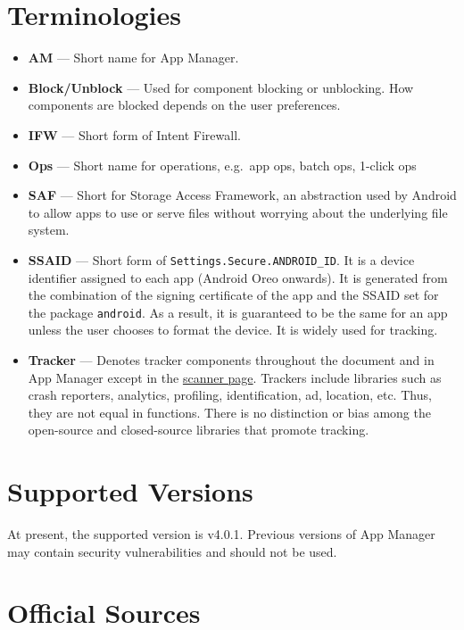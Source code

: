 \section{Terminologies}\label{sec:terminologies} %
\begin{itemize}
    \item \textbf{AM} --- Short name for App Manager.
    \item \textbf{Block/Unblock} --- Used for component blocking or unblocking. How components are blocked depends on
    the user preferences.
    \item \textbf{IFW} --- Short form of Intent Firewall.
    \item \textbf{Ops} --- Short name for operations, e.g.\ app ops, batch ops, 1-click ops
    \item \textbf{SAF} --- Short for Storage Access Framework, an abstraction used by Android to allow apps to use or
    serve files without worrying about the underlying file system.
    \item \textbf{SSAID} --- Short form of \texttt{Settings.Secure.ANDROID\_ID}. It is a device identifier assigned to
    each app (Android Oreo onwards). It is generated from the combination of the signing certificate of the app
    and the SSAID set for the package \texttt{android}. As a result, it is guaranteed to be the same for an app unless
    the user chooses to format the device. It is widely used for tracking.
    \item \textbf{Tracker} --- Denotes tracker components throughout the document and in App Manager except in the
    \hyperref[sec:scanner-page]{scanner page}. Trackers include libraries such as crash reporters, analytics,
    profiling, identification, ad, location, etc. Thus, they are not equal in functions. There is no distinction or bias
    among the open-source and closed-source libraries that promote tracking.
\end{itemize}


\section{Supported Versions}\label{sec:supported-versions} %
At present, the supported version is v4.0.1.
Previous versions of App Manager may contain security vulnerabilities and should not be used.


\section{Official Sources}\label{sec:official-sources} %

